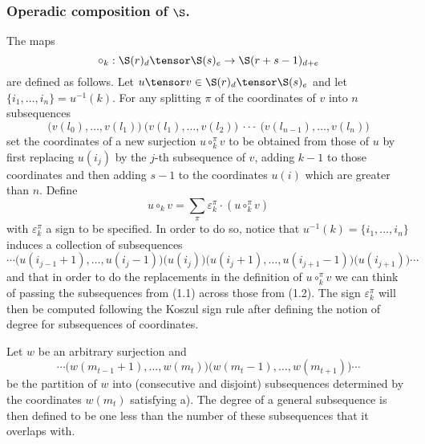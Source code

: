 \documentclass[thesis.tex]{subfiles}
\begin{document}
\subsubsection{Operadic composition of $\S$.} The maps $$\circ_k:\S(r)_d\tensor\S(s)_e\to\S(r+s-1)_{d+e}$$ are defined as follows. Let $u\tensor v\in\S(r)_d\tensor \S(s)_e$ and let $\{i_1,\dotsc,i_n\}=u^{-1}(k)$. For any splitting $\pi$ of the coordinates of $v$ into $n$ subsequences
\begin{equation}
\big(v(l_0),\dotsc,v(l_1)\big) \ \big(v(l_1),\dotsc,v(l_2)\big) \ \cdot\cdot\cdot \ \big(v(l_{n-1}),\dotsc,v(l_n)\big)
\end{equation}
set the coordinates of a new surjection $u\circ_k^{\pi}v$ to be obtained from those of $u$ by first replacing $u(i_j)$ by the $j$-th subsequence of $v$, adding $k-1$ to those coordinates and then adding $s-1$ to the coordinates $u(i)$ which are greater than $n$. Define $$u\circ_k v=\sum_{\pi}\varepsilon_k^\pi\cdot(u\circ_k^{\pi}v)$$ with $\varepsilon_k^\pi$ a sign to be specified. In order to do so, notice that $u^{-1}(k)=\{i_1,\dotsc,i_n\}$ induces a collection of subsequences
\begin{equation}
\cdots\big(u(i_{j-1}+1),\dotsc,u(i_{j}-1)\big)\big(u(i_j)\big)\big(u(i_j+1),\dotsc,u(i_{j+1}-1)\big)\big(u(i_{j+1})\big)\cdots
\end{equation} and that in order to do the replacements in the definition of $u\circ_k^{\pi}v$ we can think of passing the subsequences from (1.1) across those from (1.2). The sign $\varepsilon_k^\pi$ will then be computed following the Koszul sign rule after defining the notion of degree for subsequences of coordinates.

Let $w$ be an arbitrary surjection and $$\cdots\big(w(m_{t-1}+1),\dotsc,w(m_t)\big)\big(w(m_t-1),\dotsc,w(m_{t+1})\big)\cdots$$ be the partition of $w$ into (consecutive and disjoint) subsequences determined by the coordinates $w(m_t)$ satisfying a). The degree of a general subsequence is then defined to be one less than the number of these subsequences that it overlaps with.
\end{document}
